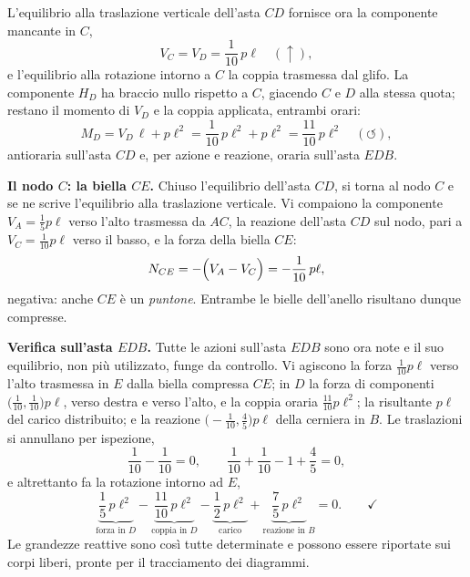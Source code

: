 \begin{esercizio}
\begin{svolgimento}
		L'equilibrio alla traslazione verticale dell'asta $CD$ fornisce ora
		la componente mancante in $C$,
		\[
		V_C = V_D = \frac{1}{10}\,p\ell \quad (\uparrow) ,
		\]
		e l'equilibrio alla rotazione intorno a $C$ la coppia trasmessa dal
		glifo. La componente $H_D$ ha braccio nullo rispetto a $C$, giacendo
		$C$ e $D$ alla stessa quota; restano il momento di $V_D$ e la coppia
		applicata, entrambi orari:
		\[
		M_D = V_D\,\ell + p\ell^{2}
		= \frac{1}{10}\,p\ell^{2} + p\ell^{2}
		= \frac{11}{10}\,p\ell^{2} \quad (\circlearrowleft) ,
		\]
		antioraria sull'asta $CD$ e, per azione e reazione, oraria sull'asta
		$EDB$.
		
		\medskip\noindent\textbf{Il nodo $C$: la biella $CE$.}
		Chiuso l'equilibrio dell'asta $CD$, si torna al nodo $C$ e se ne
		scrive l'equilibrio alla traslazione verticale. Vi compaiono la
		componente $V_A = \tfrac{1}{5}p\ell$ verso l'alto trasmessa da $AC$,
		la reazione dell'asta $CD$ sul nodo, pari a $V_C = \tfrac{1}{10}p\ell$
		verso il basso, e la forza della biella $CE$:
		\[
		N_{CE} = -\Bigl(V_A - V_C\Bigr) = -\frac{1}{10}\,p\ell ,
		\]
		negativa: anche $CE$ è un \emph{puntone}. Entrambe le bielle
		dell'anello risultano dunque compresse.
		
		\medskip\noindent\textbf{Verifica sull'asta $EDB$.}
		Tutte le azioni sull'asta $EDB$ sono ora note e il suo equilibrio,
		non più utilizzato, funge da controllo. Vi agiscono la forza
		$\tfrac{1}{10}p\ell$ verso l'alto trasmessa in $E$ dalla biella
		compressa $CE$; in $D$ la forza di componenti
		$\bigl(\tfrac{1}{10}, \tfrac{1}{10}\bigr)p\ell$, verso destra e verso
		l'alto, e la coppia oraria $\tfrac{11}{10}p\ell^{2}$; la risultante
		$p\ell$ del carico distribuito; e la reazione
		$\bigl(-\tfrac{1}{10}, \tfrac{4}{5}\bigr)p\ell$ della cerniera in
		$B$. Le traslazioni si annullano per ispezione,
		\[
		\frac{1}{10} - \frac{1}{10} = 0 ,
		\qquad
		\frac{1}{10} + \frac{1}{10} - 1 + \frac{4}{5} = 0 ,
		\]
		e altrettanto fa la rotazione intorno ad $E$,
		\[
		\underbrace{\frac{1}{5}\,p\ell^{2}}_{\text{forza in }D}
		- \underbrace{\frac{11}{10}\,p\ell^{2}}_{\text{coppia in }D}
		- \underbrace{\frac{1}{2}\,p\ell^{2}}_{\text{carico}}
		+ \underbrace{\frac{7}{5}\,p\ell^{2}}_{\text{reazione in }B}
		= 0 . \qquad\checkmark
		\]
		Le grandezze reattive sono così tutte determinate e possono essere
		riportate sui corpi liberi, pronte per il tracciamento dei
		diagrammi.
		

\end{svolgimento}
\end{esercizio}
